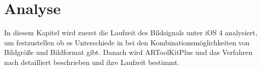 \chapter{Analyse} %
\label{cha:analyse}
\begin{comment}
	Detaillierte Beschreibung der Algorithmen inkl. O-Notation (Detailierte Darstellung der Algorithmen)
	1. ARToolKitPlus
	2. Zissermann/Clarke
	Analyse: Die Auswertung nach den Kriterien aus Kap. Vorgehen OHNE WERTUNG! Nur die Daten erheben und auswerten.
\end{comment}

In diesem Kapitel wird zuerst die Laufzeit des Bildsignals unter iOS 4 analysiert, um festzustellen ob es Unterschiede
 in bei den Kombinationsmöglichkeiten von Bildgröße und Bildformat gibt. Danach wird ARToolKitPlus und das Verfahren
 nach \citeauthor{hirzer08} detailliert beschrieben und ihre Laufzeit bestimmt.







